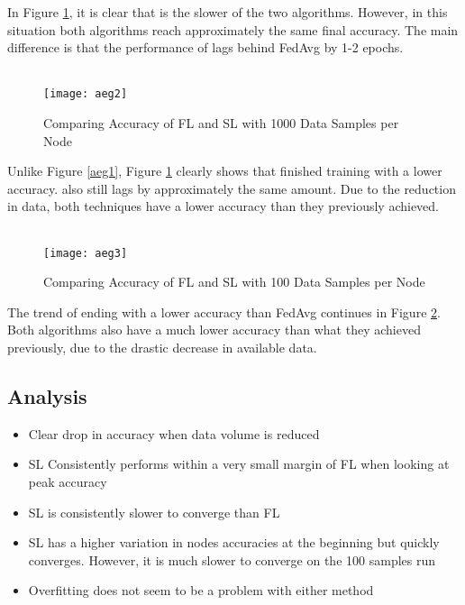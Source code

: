In Figure \ref{aeg2}, it is clear that \SL is the slower of the two algorithms. However, in this situation both algorithms reach approximately the same final accuracy. The main difference is that the performance of \SL lags behind FedAvg by 1-2 epochs. 

\begin{figure}[H]
	 \\
	\texttt{[image: aeg2]}
	\caption{Comparing Accuracy of FL and SL with 1000 Data Samples per Node}
	\label{aeg2}
\end{figure}

Unlike Figure \ref{aeg1}, Figure \ref{aeg2} clearly shows that \SL finished training with a lower accuracy. \SL also still lags by approximately the same amount. Due to the reduction in data, both techniques have a lower accuracy than they previously achieved.

\begin{figure}[H]
	 \\
	\texttt{[image: aeg3]}
	\caption{Comparing Accuracy of FL and SL with 100 Data Samples per Node}
	\label{aeg3}
\end{figure}

The trend of \SL ending with a lower accuracy than FedAvg continues in Figure \ref{aeg3}. Both algorithms also have a much lower accuracy than what they achieved previously, due to the drastic decrease in available data.

\subsection{Analysis}



\begin{itemize}
	\item Clear drop in accuracy when data volume is reduced
	\item SL Consistently performs within a very small margin of FL when looking at peak accuracy
	\item SL is consistently slower to converge than FL
	\item SL has a higher variation in nodes accuracies at the beginning but quickly converges. However, it is much slower to converge on the 100 samples run
	\item Overfitting does not seem to be a problem with either method
\end{itemize}

